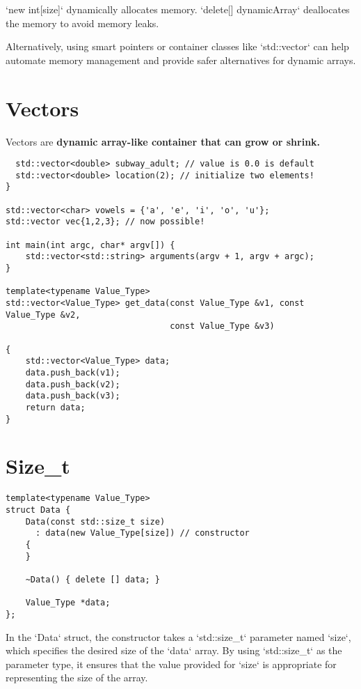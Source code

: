 \documentclass[openany]{report}
\begin{document}
`new int[size]` dynamically allocates memory. 
`delete[] dynamicArray` deallocates the memory to avoid memory leaks.

Alternatively, using smart pointers or container classes like `std::vector` can help automate memory management
and provide safer alternatives for dynamic arrays.

\section{Vectors}

Vectors are \textbf{dynamic array-like container that can grow or shrink.}

\begin{verbatim}
  std::vector<double> subway_adult; // value is 0.0 is default
  std::vector<double> location(2); // initialize two elements! 
}

std::vector<char> vowels = {'a', 'e', 'i', 'o', 'u'};
std::vector vec{1,2,3}; // now possible! 

int main(int argc, char* argv[]) {
    std::vector<std::string> arguments(argv + 1, argv + argc);
}

template<typename Value_Type>
std::vector<Value_Type> get_data(const Value_Type &v1, const Value_Type &v2,
                                 const Value_Type &v3)

{
    std::vector<Value_Type> data;
    data.push_back(v1);
    data.push_back(v2);
    data.push_back(v3);
    return data;
}
\end{verbatim}

\section{Size\_t}

\begin{verbatim}
template<typename Value_Type>
struct Data {
    Data(const std::size_t size)
      : data(new Value_Type[size]) // constructor
    {
    }

    ~Data() { delete [] data; }

    Value_Type *data;
};
\end{verbatim}

In the `Data` struct, the constructor takes a `std::size\_t` parameter named `size`,
which specifies the desired size of the `data` array. 
By using `std::size\_t` as the parameter type, 
it ensures that the value provided for `size` is appropriate for representing the size of the array.
\end{document}
